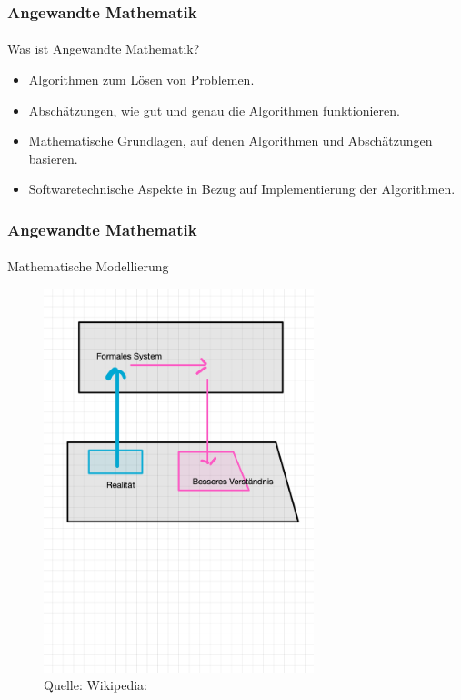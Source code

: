 \documentclass{beamer}
\begin{document}
\begin{frame}
    \frametitle{Angewandte Mathematik}
\framesubtitle{}
    \begin{block}{Was ist Angewandte Mathematik?}
\begin{itemize}
\pause \item Algorithmen zum Lösen von Problemen.
\pause \item Abschätzungen, wie gut und genau die Algorithmen funktionieren.
\pause \item Mathematische Grundlagen, auf denen Algorithmen und Abschätzungen basieren. 
\pause \item Softwaretechnische Aspekte in Bezug auf  Implementierung der Algorithmen.
\end{itemize}
\end{block}
 \end{frame}

\begin{frame}
    \frametitle{Angewandte Mathematik}
\framesubtitle{}
    \begin{block}{Mathematische Modellierung}
\begin{figure}[H]
      \centering
    \includegraphics[width=0.7\textwidth]{images/modellierung}
      \caption{Quelle: Wikipedia: }
\end{figure}
\end{block}
 \end{frame}
\end{document}
